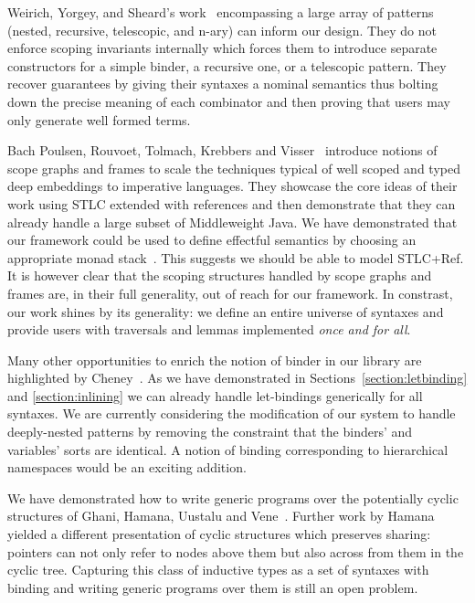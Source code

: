 Weirich, Yorgey, and Sheard's work~\citeyear{DBLP:conf/icfp/WeirichYS11}
encompassing a large array of patterns (nested, recursive, telescopic, and
n-ary) can inform our design. They do not enforce scoping invariants internally
which forces them to introduce separate constructors for a simple binder, a
recursive one, or a telescopic pattern. They recover guarantees by giving
their syntaxes a nominal semantics thus bolting down the precise meaning of
each combinator and then proving that users may only generate well formed
terms.

Bach Poulsen, Rouvoet, Tolmach, Krebbers and Visser~\citeyear{BachPoulsen}
introduce notions of scope graphs and frames to scale the techniques typical
of well scoped and typed deep embeddings to imperative languages.
They showcase the core ideas of their work using STLC extended with references
and then demonstrate that they can already handle a large subset of Middleweight
Java.
%
We have demonstrated that our framework could be used to define effectful
semantics by choosing an appropriate monad stack~\cite{DBLP:journals/iandc/Moggi91}.
This suggests we should be able to model STLC+Ref. It is however clear that
the scoping structures handled by scope graphs and frames are, in their full
generality, out of reach for our framework. In constrast, our work shines by
its generality: we define an entire universe of syntaxes and provide users
with traversals and lemmas implemented \emph{once and for all}.

Many other opportunities to enrich the notion of binder in our library are
highlighted by Cheney~\citeyear{DBLP:conf/icfp/Cheney05a}. As we have demonstrated
in Sections~\ref{section:letbinding} and \ref{section:inlining} we can already
handle let-bindings generically for all syntaxes. We are currently considering
the modification of our system to handle deeply-nested patterns by removing the
constraint that the binders' and variables' sorts are identical. A notion of
binding corresponding to hierarchical namespaces would be an exciting addition.

We have demonstrated how to write generic programs over the potentially
cyclic structures of Ghani, Hamana, Uustalu and Vene~\citeyear{ghani2006representing}.
Further work by Hamana~\citeyear{Hamana2009} yielded a different presentation
of cyclic structures which preserves sharing: pointers can not only refer
to nodes above them but also across from them in the cyclic tree. Capturing
this class of inductive types as a set of syntaxes with binding and writing
generic programs over them is still an open problem.

